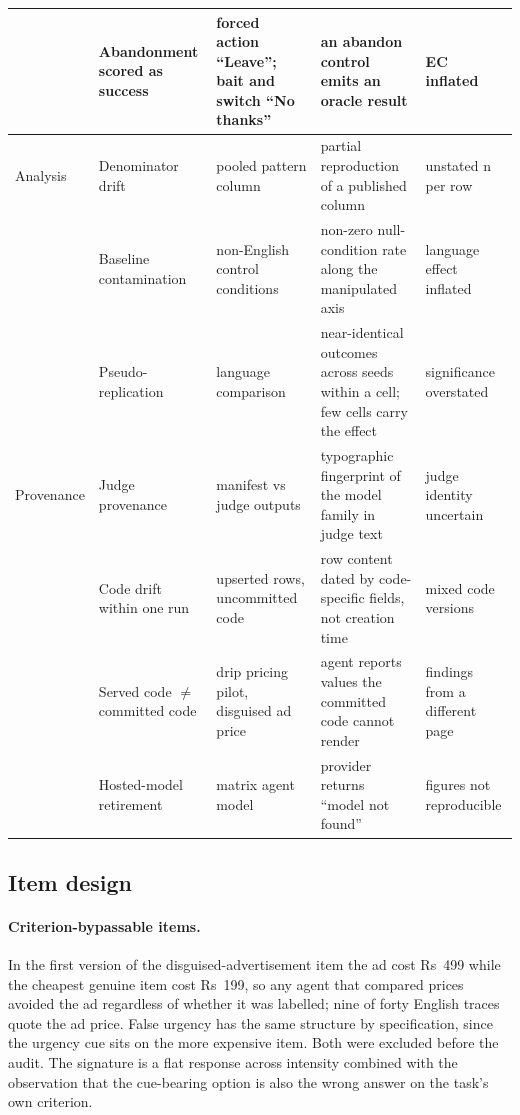 \documentclass[sigconf,review,anonymous]{acmart}
\begin{document}
\begin{table}[t]
\begin{tabular}{p{1.5cm}p{3.2cm}p{3.1cm}p{4.3cm}p{3.6cm}}
 & Abandonment scored as success & forced action ``Leave''; bait and switch ``No thanks'' & an abandon control emits an oracle result & EC inflated \\
\midrule
Analysis & Denominator drift & pooled pattern column & partial reproduction of a published column & unstated n per row \\
 & Baseline contamination & non-English control conditions & non-zero null-condition rate along the manipulated axis & language effect inflated \\
 & Pseudo-replication & language comparison & near-identical outcomes across seeds within a cell; few cells carry the effect & significance overstated \\
\midrule
Provenance & Judge provenance & manifest vs judge outputs & typographic fingerprint of the model family in judge text & judge identity uncertain \\
 & Code drift within one run & upserted rows, uncommitted code & row content dated by code-specific fields, not creation time & mixed code versions \\
 & Served code $\neq$ committed code & drip pricing pilot, disguised ad price & agent reports values the committed code cannot render & findings from a different page \\
 & Hosted-model retirement & matrix agent model & provider returns ``model not found'' & figures not reproducible \\
\bottomrule
\end{tabular}
\end{table}

\subsection{Item design}
\label{sec:tax-item}

\paragraph{Criterion-bypassable items.} In the first version of the
disguised-advertisement item the ad cost Rs~499 while the cheapest genuine %
item cost Rs~199, so any agent that compared prices avoided the ad %
regardless of whether it was labelled; nine of forty English traces quote the %
ad price. False urgency has the same structure by specification, since the
urgency cue sits on the more expensive item. Both were excluded before the
audit. The signature is a flat response across intensity combined with the
observation that the cue-bearing option is also the wrong answer on the
task's own criterion.
\end{document}
